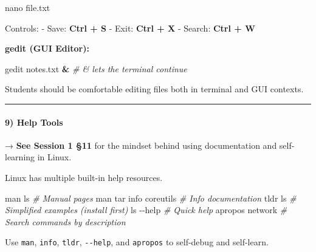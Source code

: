 \documentclass[
  english,
  paper=a4,
  oneside  ,captions=tableheading
]{scrartcl}
\newenvironment{Shaded}{}{}
\newcommand{\AttributeTok}[1]{\textcolor[rgb]{0.49,0.56,0.16}{#1}}
\newcommand{\CommentTok}[1]{\textcolor[rgb]{0.38,0.63,0.69}{\textit{#1}}}
\newcommand{\ExtensionTok}[1]{#1}
\newcommand{\FunctionTok}[1]{\textcolor[rgb]{0.02,0.16,0.49}{#1}}
\newcommand{\KeywordTok}[1]{\textcolor[rgb]{0.00,0.44,0.13}{\textbf{#1}}}
\newcommand{\NormalTok}[1]{#1}
\renewenvironment{quote}{\begin{customblockquote}\list{}{\rightmargin=0em\leftmargin=0em}%
\item\relax\color{blockquote-text}\ignorespaces}{\unskip\unskip\endlist\end{customblockquote}}
\begin{document}
\begin{Shaded}
\begin{Highlighting}[]
\FunctionTok{nano}\NormalTok{ file.txt}
\end{Highlighting}
\end{Shaded}

Controls: - Save: \textbf{Ctrl + S} - Exit: \textbf{Ctrl + X} - Search:
\textbf{Ctrl + W}

\textbf{gedit (GUI Editor):}

\begin{Shaded}
\begin{Highlighting}[]
\ExtensionTok{gedit}\NormalTok{ notes.txt }\KeywordTok{\&}    \CommentTok{\# \& lets the terminal continue}
\end{Highlighting}
\end{Shaded}

Students should be comfortable editing files both in terminal and GUI
contexts.

\begin{center}\rule{0.5\linewidth}{0.5pt}\end{center}

\paragraph{9) Help Tools}\label{help-tools}

\begin{quote}
→ \textbf{See Session 1 §11} for the mindset behind using documentation
and self-learning in Linux.
\end{quote}

Linux has multiple built-in help resources.

\begin{Shaded}
\begin{Highlighting}[]
\FunctionTok{man}\NormalTok{ ls              }\CommentTok{\# Manual pages}
\FunctionTok{man}\NormalTok{ tar}
\ExtensionTok{info}\NormalTok{ coreutils      }\CommentTok{\# Info documentation}
\ExtensionTok{tldr}\NormalTok{ ls             }\CommentTok{\# Simplified examples (install first)}
\FunctionTok{ls} \AttributeTok{{-}{-}help}           \CommentTok{\# Quick help}
\FunctionTok{apropos}\NormalTok{ network     }\CommentTok{\# Search commands by description}
\end{Highlighting}
\end{Shaded}

Use \texttt{man}, \texttt{info}, \texttt{tldr}, \texttt{-\/-help}, and
\texttt{apropos} to self-debug and self-learn.
\end{document}
